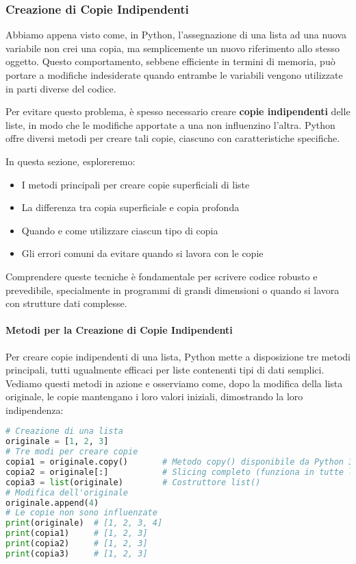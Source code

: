 \subsubsection{Creazione di Copie Indipendenti}
Abbiamo appena visto come, in Python, l'assegnazione di una lista ad una nuova variabile non crei una copia, ma semplicemente un nuovo riferimento allo stesso oggetto. Questo comportamento, sebbene efficiente in termini di memoria, può portare a modifiche indesiderate quando entrambe le variabili vengono utilizzate in parti diverse del codice.

Per evitare questo problema, è spesso necessario creare \textbf{copie indipendenti} delle liste, in modo che le modifiche apportate a una non influenzino l'altra. Python offre diversi metodi per creare tali copie, ciascuno con caratteristiche specifiche.

In questa sezione, esploreremo:
\begin{itemize}
    \item I metodi principali per creare copie superficiali di liste
    \item La differenza tra copia superficiale e copia profonda
    \item Quando e come utilizzare ciascun tipo di copia
    \item Gli errori comuni da evitare quando si lavora con le copie
\end{itemize}

Comprendere queste tecniche è fondamentale per scrivere codice robusto e prevedibile, specialmente in programmi di grandi dimensioni o quando si lavora con strutture dati complesse.
\newline




\paragraph{Metodi per la Creazione di Copie Indipendenti}\label{metodiCopia}
Per creare copie indipendenti di una lista, Python mette a disposizione tre metodi principali, tutti ugualmente efficaci per liste contenenti tipi di dati semplici. Vediamo questi metodi in azione e osserviamo come, dopo la modifica della lista originale, le copie mantengano i loro valori iniziali, dimostrando la loro indipendenza:

\begin{lstlisting}[language=Python]
# Creazione di una lista
originale = [1, 2, 3]
# Tre modi per creare copie
copia1 = originale.copy()       # Metodo copy() disponibile da Python 3.3
copia2 = originale[:]           # Slicing completo (funziona in tutte le versioni)
copia3 = list(originale)        # Costruttore list()
# Modifica dell'originale
originale.append(4)
# Le copie non sono influenzate
print(originale)  # [1, 2, 3, 4]
print(copia1)     # [1, 2, 3]
print(copia2)     # [1, 2, 3]
print(copia3)     # [1, 2, 3]
\end{lstlisting}

